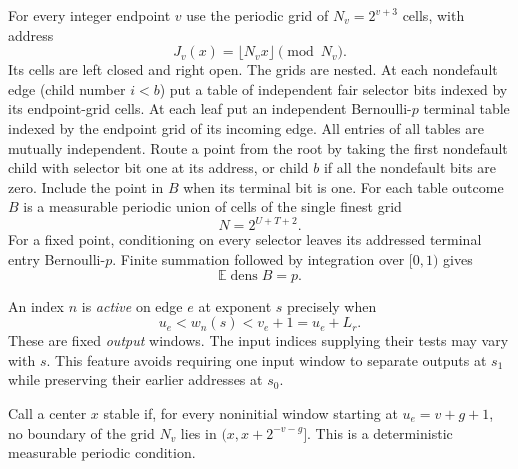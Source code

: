 \documentclass[11pt]{article}
\theoremstyle{definition}
\theoremstyle{remark}
\newcommand{\dens}{\operatorname{dens}}
\begin{document}
For every integer endpoint $v$ use the periodic grid of $N_v=2^{v+3}$ cells,
with address
\[
 J_v(x)=\lfloor N_vx\rfloor\pmod{N_v}.
\]
Its cells are left closed and right open. The grids are nested. At each
nondefault edge (child number $i<b$) put a table of independent fair selector
bits indexed by its endpoint-grid cells. At each leaf put an independent
Bernoulli-$p$ terminal table indexed by the endpoint grid of its incoming edge.
All entries of all tables are mutually independent. Route a point from the
root by taking the first nondefault child with selector bit one at its address,
or child $b$ if all the nondefault bits are zero. Include the point in $B$ when
its terminal bit is one. For each table outcome $B$ is a measurable periodic
union of cells of the single finest grid
\begin{equation}\label{eq:finest}
 N=2^{U+T+2}.
\end{equation}
For a fixed point, conditioning on every selector leaves its addressed terminal
entry Bernoulli-$p$. Finite summation followed by integration over $[0,1)$ gives
\begin{equation}\label{eq:expectedB}
 \mathbb E\dens B=p.
\end{equation}

An index $n$ is \emph{active} on edge $e$ at exponent $s$ precisely when
\begin{equation}\label{eq:activation}
 u_e<w_n(s)<v_e+1=u_e+L_r.
\end{equation}
These are fixed \emph{output} windows. The input indices supplying their tests
may vary with $s$. This feature avoids requiring one input window to separate
outputs at $s_1$ while preserving their earlier addresses at $s_0$.

Call a center $x$ stable if, for every noninitial window starting at
$u_e=v+g+1$, no boundary of the grid $N_v$ lies in
$(x,x+2^{-v-g}]$. This is a deterministic measurable periodic condition.
\end{document}
